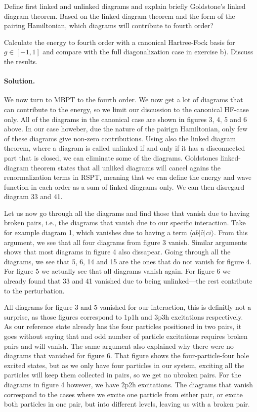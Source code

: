 \documentclass[%
twoside,                 %
final,                   %
10pt]{article}
\newenvironment{doconceexercise}{}{}
\begin{document}
\begin{doconceexercise}
Define first linked and unlinked diagrams and explain briefly Goldstone's linked diagram theorem.
Based on the linked diagram theorem and the form of the pairing Hamiltonian, which diagrams will contribute
to fourth order? 

Calculate the energy to fourth order with a canonical Hartree-Fock basis for $g\in [-1,1]$ and compare
with the full diagonalization case in exercise b). Discuss the results.


\paragraph{Solution.}
We now turn to MBPT to the fourth order. We now get a lot of diagrams
that can contribute to the energy, so we limit our discussion to the
canonical HF-case only. All of the diagrams in the canonical case are
shown in figures 3, 4, 5 and 6 above. In our case howeber, due the
nature of the pairign Hamiltonian, only few of these diagrams give
non-zero contributions. Using also the linked diagram theorem, where a
diagram is called unlinked if and only if it has a disconnected part
that is closed, we can eliminate some of the diagrams. Goldstones
linked-diagram theorem states that all unliked diagrams will cancel
agains the renormalization terms in RSPT, meaning that we can define
the energy and wave function in each order as a sum of linked diagrams
only. We can then disregard diagram 33 and 41.

Let us now go through all the diagrams and find those that vanish due
to having broken pairs, i.e., the diagrams that vanish due to our
specific interaction. Take for example diagram 1, which vanishes due
to having a term $\langle ab\vert \hat{v} \vert ci\rangle$. From this
argument, we see that all four diagrams from figure 3 vanish. Similar
arguments shows that most diagrams in figure 4 also dissapear. Going
through all the diagrams, we see that 5, 6, 14 and 15 are the ones
that do not vanish for figure 4. For figure 5 we actually see that all
diagrams vanish again. For figure 6 we already found that 33 and 41
vanished due to being unlinked---the rest contribute to the
perturbation.

All diagrams for figure 3 and 5 vanished for our interaction, this is
definitly not a surprise, as those figures correspond to 1p1h and 3p3h
excitations respectively. As our reference state already has the four
particles positioned in two pairs, it goes without saying that and odd
number of particle excitations requires broken pairs and will
vanish. The same argument also explained why there were no diagrams
that vanished for figure 6. That figure shows the four-particle-four
hole excited states, but as we only have four particles in our system,
exciting all the particles will keep them collected in pairs, so we
get no ubroken pairs. For the diagrams in figure 4 however, we have
2p2h excitations. The diagrams that vanish correspond to the cases
where we excite one particle from either pair, or excite both
particles in one pair, but into different levels, leaving us with a
broken pair.


\end{doconceexercise}
\end{document}
